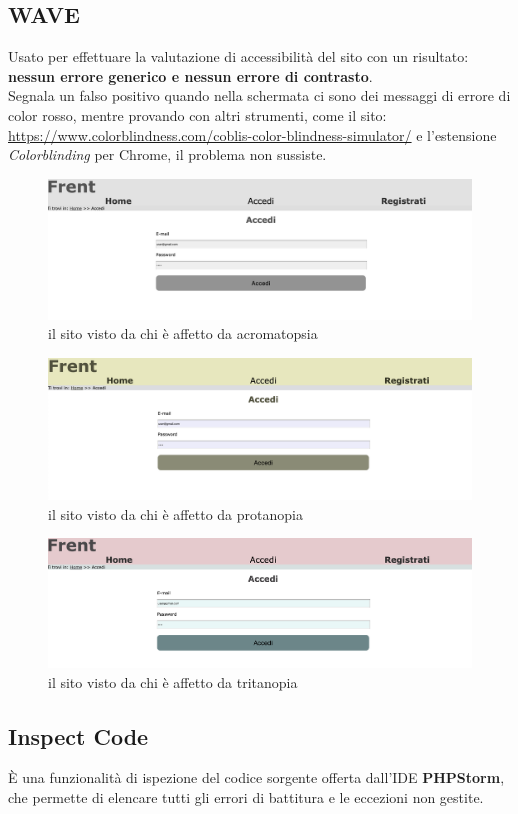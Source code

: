 \documentclass[1_relazione.tex]{subfiles}
\begin{document}
    \subsection{WAVE}
    Usato per effettuare la valutazione di accessibilit\`{a} del sito con un risultato: \textbf{nessun errore generico e nessun errore di contrasto}.
    \\Segnala un falso positivo quando nella schermata ci sono dei messaggi di errore di color rosso, mentre provando con altri strumenti, come il sito:\\ \url{https://www.colorblindness.com/coblis-color-blindness-simulator/}
    e l'estensione \textit{Colorblinding} per Chrome, il problema non sussiste.
    \begin{figure}[h!]
        \centering
        \includegraphics[scale=0.27]{immagini/Achromatopsia.png}
        \caption{il sito visto da chi \`{e} affetto da acromatopsia}
    \end{figure}
    \begin{figure}[h!]
        \centering
        \includegraphics[scale=0.27]{immagini/Protanopia.png}
        \caption{il sito visto da chi \`{e} affetto da protanopia}
    \end{figure}
    \newpage
    \begin{figure}[h!]
        \centering
        \includegraphics[scale=0.27]{immagini/Tritanopia.png}
        \caption{il sito visto da chi \`{e} affetto da tritanopia}
    \end{figure}

    \subsection{Inspect Code}
    \`{E} una funzionalit\`{a} di ispezione del codice sorgente offerta dall'IDE \textbf{PHPStorm}, che permette di elencare tutti gli errori di battitura e le eccezioni non gestite.
\end{document}
